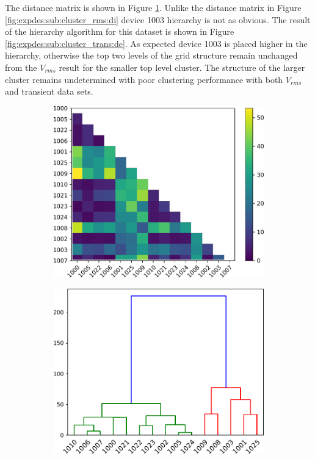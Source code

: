 The distance matrix is shown in Figure \ref{fig:expdes:sub:cluster_trans:di}.
Unlike the distance matrix in Figure \ref{fig:expdes:sub:cluster_rms:di} device 1003 hierarchy is not as obvious.
The result of the hierarchy algorithm for this dataset is shown in Figure \ref{fig:expdes:sub:cluster_trans:de}.
As expected device 1003 is placed higher in the hierarchy, otherwise the top two levels of the grid structure remain unchanged from the $V_{rms}$ result for the smaller top level cluster.
The structure of the larger cluster remains undetermined with poor clustering performance with both $V_{rms}$ and transient data sets.
\begin{figure}[ht!]
    \centering
    \begin{subfigure}{0.45\textwidth}
        \centering
        \includegraphics[width=1\linewidth]{img/napali_eval/subthreshold/clustering/distance_trans.pdf}
        \caption{}
        \label{fig:expdes:sub:cluster_trans:di}
    \end{subfigure} \hspace{5mm}
    \begin{subfigure}{0.45\textwidth}
        \centering
        \includegraphics[width=1\linewidth]{img/napali_eval/subthreshold/clustering/dendrogram_trans.pdf}

\end{subfigure}
\end{figure}
